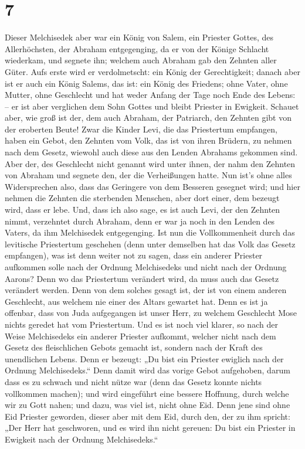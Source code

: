 \hypertarget{section-6}{%
\section{7}\label{section-6}}

 Dieser Melchisedek aber war ein König von Salem, ein
Priester Gottes, des Allerhöchsten, der Abraham entgegenging, da er von
der Könige Schlacht wiederkam, und segnete ihn;  welchem
auch Abraham gab den Zehnten aller Güter. Aufs erste wird er
verdolmetscht: ein König der Gerechtigkeit; danach aber ist er auch ein
König Salems, das ist: ein König des Friedens;  ohne
Vater, ohne Mutter, ohne Geschlecht und hat weder Anfang der Tage noch
Ende des Lebens: -- er ist aber verglichen dem Sohn Gottes und bleibt
Priester in Ewigkeit.  Schauet aber, wie groß ist der, dem
auch Abraham, der Patriarch, den Zehnten gibt von der eroberten Beute!
 Zwar die Kinder Levi, die das Priestertum empfangen,
haben ein Gebot, den Zehnten vom Volk, das ist von ihren Brüdern, zu
nehmen nach dem Gesetz, wiewohl auch diese aus den Lenden Abrahams
gekommen sind.  Aber der, des Geschlecht nicht genannt
wird unter ihnen, der nahm den Zehnten von Abraham und segnete den, der
die Verheißungen hatte.  Nun ist's ohne alles
Widersprechen also, dass das Geringere von dem Besseren gesegnet wird;
 und hier nehmen die Zehnten die sterbenden Menschen, aber
dort einer, dem bezeugt wird, dass er lebe.  Und, dass ich
also sage, es ist auch Levi, der den Zehnten nimmt, verzehntet durch
Abraham,  denn er war ja noch in den Lenden des Vaters,
da ihm Melchisedek entgegenging.  Ist nun die
Vollkommenheit durch das levitische Priestertum geschehen (denn unter
demselben hat das Volk das Gesetz empfangen), was ist denn weiter not zu
sagen, dass ein anderer Priester aufkommen solle nach der Ordnung
Melchisedeks und nicht nach der Ordnung Aarons?  Denn wo
das Priestertum verändert wird, da muss auch das Gesetz verändert
werden.  Denn von dem solches gesagt ist, der ist von
einem anderen Geschlecht, aus welchem nie einer des Altars gewartet hat.
 Denn es ist ja offenbar, dass von Juda aufgegangen ist
unser Herr, zu welchem Geschlecht Mose nichts geredet hat vom
Priestertum.  Und es ist noch viel klarer, so nach der
Weise Melchisedeks ein anderer Priester aufkommt, 
welcher nicht nach dem Gesetz des fleischlichen Gebots gemacht ist,
sondern nach der Kraft des unendlichen Lebens.  Denn er
bezeugt: „Du bist ein Priester ewiglich nach der Ordnung Melchisedeks.``
 Denn damit wird das vorige Gebot aufgehoben, darum dass
es zu schwach und nicht nütze war  (denn das Gesetz
konnte nichts vollkommen machen); und wird eingeführt eine bessere
Hoffnung, durch welche wir zu Gott nahen;  und dazu, was
viel ist, nicht ohne Eid. Denn jene sind ohne Eid Priester geworden,
 dieser aber mit dem Eid, durch den, der zu ihm spricht:
„Der Herr hat geschworen, und es wird ihn nicht gereuen: Du bist ein
Priester in Ewigkeit nach der Ordnung Melchisedeks.``

